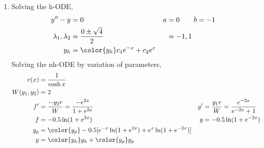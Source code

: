 \begin{enumerate}
    \item Solving the h-ODE,
          \begin{align}
              y'' - y                  & = 0                                      &
              a                        & = 0 \qquad b = -1                          \\
              \lambda_{1}, \lambda_{2} & = \frac{0 \pm \sqrt{4}}{2}               &
                                       & = -1, 1                                    \\
              y_{h}                    & = {\color{y_h} c_{1}e^{-x} + c_{2}e^{x}}
          \end{align}
          Solving the nh-ODE by variation of parameters,
          \begin{align}
              r(x)            & = \frac{1}{\cosh x}                                \\
              W(y_{1}, y_{2}) & = 2                                                \\
              f'              & = \frac{-y_{2}r}{W} = \frac{-e^{2x}}{1 + e^{2x}} &
              g'              & = \frac{y_{1}r}{W} = \frac{e^{-2x}}{e^{-2x} + 1}   \\
              f               & = -0.5\ln (1 + e^{2x})                           &
              g               & = -0.5\ln(1 + e^{-2x})                             \\
              y_{p}           & = {\color{y_p} -0.5[e^{-x}\ln(1 + e^{2x})
              + e^{x}\ln(1 + e^{-2x})]}                                            \\
              y               & = {\color{y_h} y_{h}} + {\color{y_p} y_{p}}
          \end{align}


\end{enumerate}

